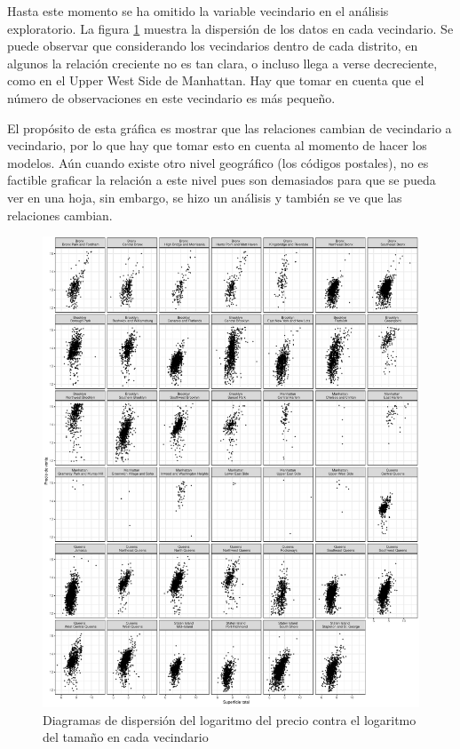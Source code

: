  

Hasta este momento se ha omitido la variable vecindario en el análisis exploratorio. La figura \ref{fig:eda_scatter_by_neighborhood} muestra la dispersión de los datos en cada vecindario. Se puede observar que considerando los vecindarios dentro de cada distrito, en algunos la relación creciente no es tan clara, o incluso llega a verse decreciente, como en el Upper West Side de Manhattan. Hay que tomar en cuenta que el número de observaciones en este vecindario es más pequeño. %

El propósito de esta gráfica es mostrar que las relaciones cambian de vecindario a vecindario, por lo que hay que tomar esto en cuenta al momento de hacer los modelos. Aún cuando existe otro nivel geográfico (los códigos postales), no es factible graficar la relación a este nivel pues son demasiados para que se pueda ver en una hoja, sin embargo, se hizo un análisis y también se ve que las relaciones cambian.

\begin{figure}[H]
    \centering
    \includegraphics[width=1.03\textwidth]{images/eda_scatter_by_neighborhood.pdf}
    \caption{Diagramas de dispersión del logaritmo del precio contra el logaritmo del tamaño en cada vecindario}
    \label{fig:eda_scatter_by_neighborhood}
\end{figure}

